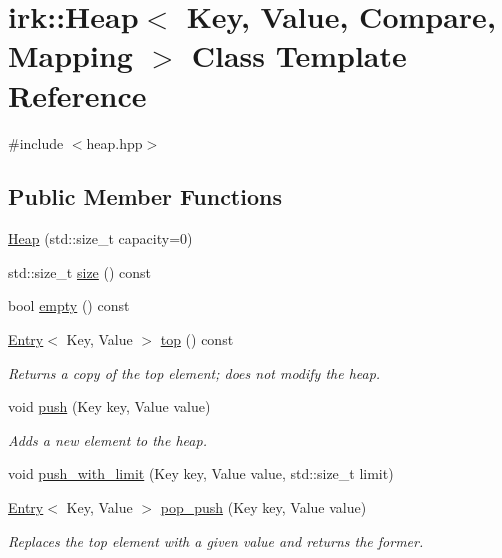 \hypertarget{classirk_1_1Heap}{}\section{irk\+:\+:Heap$<$ Key, Value, Compare, Mapping $>$ Class Template Reference}
\label{classirk_1_1Heap}


{\ttfamily \#include $<$heap.\+hpp$>$}

\subsection*{Public Member Functions}
\begin{DoxyCompactItemize}
\item 
\mbox{\hyperlink{classirk_1_1Heap_a9e92f4197b0da14b752fef07cce1efab}{Heap}} (std\+::size\+\_\+t capacity=0)
\item 
std\+::size\+\_\+t \mbox{\hyperlink{classirk_1_1Heap_ac917debc1615139f885ac1c699cad6de}{size}} () const
\item 
bool \mbox{\hyperlink{classirk_1_1Heap_a6f7cb66b2e9eea341877b8b42a2b7b38}{empty}} () const
\item 
\mbox{\hyperlink{structirk_1_1Entry}{Entry}}$<$ Key, Value $>$ \mbox{\hyperlink{classirk_1_1Heap_a54643e4b569e3fbac56af72e04eb2b6d}{top}} () const
\begin{DoxyCompactList}\small\item\em Returns a copy of the top element; does not modify the heap. \end{DoxyCompactList}\item 
void \mbox{\hyperlink{classirk_1_1Heap_aea9e1721c784b5d6c337e8792bd25676}{push}} (Key key, Value value)
\begin{DoxyCompactList}\small\item\em Adds a new element to the heap. \end{DoxyCompactList}\item 
void \mbox{\hyperlink{classirk_1_1Heap_a0ccdd3050451a474e371c4e713b6b0d3}{push\+\_\+with\+\_\+limit}} (Key key, Value value, std\+::size\+\_\+t limit)
\item 
\mbox{\hyperlink{structirk_1_1Entry}{Entry}}$<$ Key, Value $>$ \mbox{\hyperlink{classirk_1_1Heap_abea088d8e2a513c571534eaf69ca7b84}{pop\+\_\+push}} (Key key, Value value)
\begin{DoxyCompactList}\small\item\em Replaces the top element with a given value and returns the former. \end{DoxyCompactList}\item 

\end{DoxyCompactItemize}
